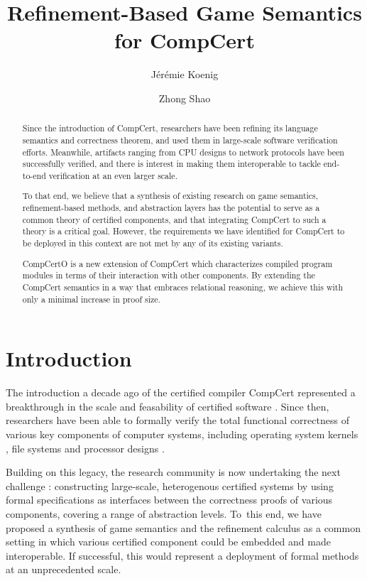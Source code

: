 \documentclass[acmsmall,authordraft]{acmart}
\title{Refinement-Based Game Semantics for CompCert} %
\author{J\'er\'emie Koenig}
\affiliation{Yale University}
\author{Zhong Shao}
\affiliation{Yale University}
\begin{document}
\begin{abstract} %
Since the introduction of CompCert,
researchers have been refining
its language semantics and correctness theorem,
and used them in
large-scale software verification efforts.
Meanwhile,
artifacts ranging from CPU designs to network protocols
have been successfully verified,
and there is interest in
making them interoperable
to tackle end-to-end verification
at an even larger scale.

To that end,
we believe that
a synthesis of existing research on
game semantics,
refinement-based methods, and
abstraction layers
has the potential to serve as a common theory
of certified components,
and that integrating CompCert to such a theory
is a critical goal.
However,
the requirements we have identified for
CompCert to be deployed in this context
are not met by any of its existing variants.

CompCertO is
a new extension of CompCert
which characterizes compiled program modules
in terms of their interaction with other components.
By extending the CompCert semantics
in a way that embraces relational reasoning,
we achieve this with only a minimal increase
in proof size.
\end{abstract}

\maketitle

\section{Introduction} %


The introduction a decade ago of
the certified compiler CompCert \cite{compcert}
represented a breakthrough
in the scale and feasability of
certified software \cite{shao10}.
Since then,
researchers have been able to formally verify the
total functional correctness
of various key components of computer systems,
including
operating system kernels \cite{sel4,popl15},
file systems \cite{fscq} and
processor designs \cite{safe,bluespec}.

Building on this legacy,
the research community is now undertaking the next challenge
\cite{deepspec}:
constructing large-scale, heterogenous certified systems
by using formal specifications as interfaces
between the correctness proofs of various components,
covering a range of abstraction levels.
To~this end,
we have proposed
a synthesis of game semantics and the refinement calculus
\cite{rbgs-cal}
as a common setting
in which various
certified component could be embedded and
made interoperable.
If successful,
this would represent a deployment of formal methods
at an unprecedented scale.
\end{document}
